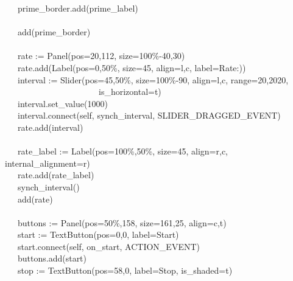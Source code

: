 {\>   \ \ \ prime\_border.add(prime\_label) \\
\ \\
\>   \ \ \ add(prime\_border) \\
\ \\
\>   \ \ \ rate := Panel({\textquotedbl}pos=20,112{\textquotedbl},
{\textquotedbl}size=100\%-40,30{\textquotedbl}) \\
\>   \ \ \ rate.add(Label({\textquotedbl}pos=0,50\%{\textquotedbl},
{\textquotedbl}size=45{\textquotedbl},
{\textquotedbl}align=l,c{\textquotedbl},
{\textquotedbl}label=Rate:{\textquotedbl})) \\
\>   \ \ \ interval :=
Slider({\textquotedbl}pos=45,50\%{\textquotedbl},
{\textquotedbl}size=100\%-90{\textquotedbl},
{\textquotedbl}align=l,c{\textquotedbl},
{\textquotedbl}range=20,2020{\textquotedbl}, \\
\>   \ \ \ \ \ \ \ \ \ \ \ \ \ \ \ \ \ \ \ \ \ \ {\textquotedbl}is\_horizontal=t{\textquotedbl}) \\
\>   \ \ \ interval.set\_value(1000) \\
\>   \ \ \ interval.connect(self,
{\textquotedbl}synch\_interval{\textquotedbl}, SLIDER\_DRAGGED\_EVENT) \\
\>   \ \ \ rate.add(interval) \\
\ \\
\>   \ \ \ rate\_label :=
Label({\textquotedbl}pos=100\%,50\%{\textquotedbl},
{\textquotedbl}size=45{\textquotedbl},
{\textquotedbl}align=r,c{\textquotedbl},
{\textquotedbl}internal\_alignment=r{\textquotedbl}) \\
\>   \ \ \ rate.add(rate\_label) \\
\>   \ \ \ synch\_interval() \\
\>   \ \ \ add(rate) \\
\ \\
\>   \ \ \ buttons := Panel({\textquotedbl}pos=50\%,158{\textquotedbl},
{\textquotedbl}size=161,25{\textquotedbl},
{\textquotedbl}align=c,t{\textquotedbl}) \\
\>   \ \ \ start := TextButton({\textquotedbl}pos=0,0{\textquotedbl},
{\textquotedbl}label=Start{\textquotedbl}) \\
\>   \ \ \ start.connect(self, {\textquotedbl}on\_start{\textquotedbl},
ACTION\_EVENT) \\
\>   \ \ \ buttons.add(start) \\
\>   \ \ \ stop := TextButton({\textquotedbl}pos=58,0{\textquotedbl},
{\textquotedbl}label=Stop{\textquotedbl},
{\textquotedbl}is\_shaded=t{\textquotedbl}) \\
}
